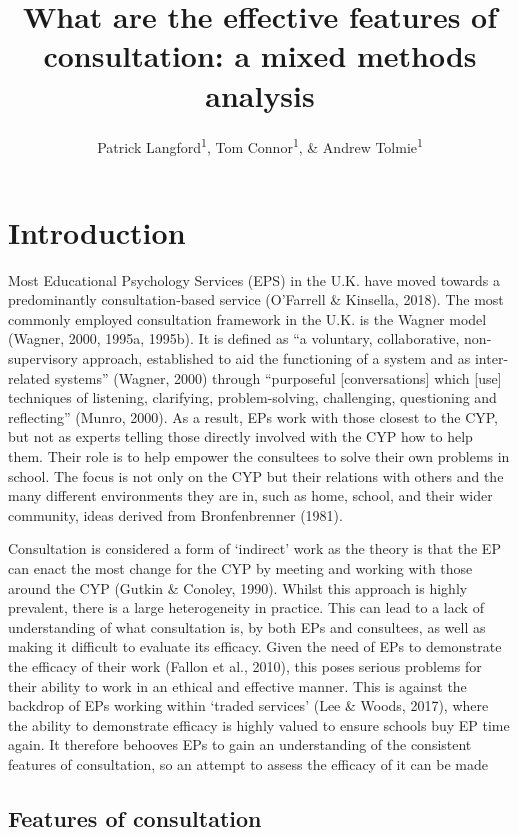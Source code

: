 \documentclass[
  english,
  man,floatsintext]{apa6}
\title{What are the effective features of consultation: a mixed methods analysis}
\author{Patrick Langford\textsuperscript{1}, Tom Connor\textsuperscript{1}, \& Andrew Tolmie\textsuperscript{1}}
\date{}
\affiliation{\vspace{0.5cm}\textsuperscript{1} Institute of Education UCL}
\begin{document}
\maketitle

\hypertarget{introduction}{%
\section{Introduction}\label{introduction}}

Most Educational Psychology Services (EPS) in the U.K. have moved towards a predominantly consultation-based service (O'Farrell \& Kinsella, 2018). The most commonly employed consultation framework in the U.K. is the Wagner model (Wagner, 2000, 1995a, 1995b). It is defined as ``a voluntary, collaborative, non-supervisory approach, established to aid the functioning of a system and as inter-related systems'' (Wagner, 2000) through ``purposeful {[}conversations{]} which {[}use{]} techniques of listening, clarifying, problem-solving, challenging, questioning and reflecting'' (Munro, 2000). As a result, EPs work with those closest to the CYP, but not as experts telling those directly involved with the CYP how to help them. Their role is to help empower the consultees to solve their own problems in school. The focus is not only on the CYP but their relations with others and the many different environments they are in, such as home, school, and their wider community, ideas derived from Bronfenbrenner (1981).

Consultation is considered a form of `indirect' work as the theory is that the EP can enact the most change for the CYP by meeting and working with those around the CYP (Gutkin \& Conoley, 1990). Whilst this approach is highly prevalent, there is a large heterogeneity in practice. This can lead to a lack of understanding of what consultation is, by both EPs and consultees, as well as making it difficult to evaluate its efficacy. Given the need of EPs to demonstrate the efficacy of their work (Fallon et al., 2010), this poses serious problems for their ability to work in an ethical and effective manner. This is against the backdrop of EPs working within `traded services' (Lee \& Woods, 2017), where the ability to demonstrate efficacy is highly valued to ensure schools buy EP time again. It therefore behooves EPs to gain an understanding of the consistent features of consultation, so an attempt to assess the efficacy of it can be made

\hypertarget{features-of-consultation}{%
\subsection{Features of consultation}\label{features-of-consultation}}
\end{document}
